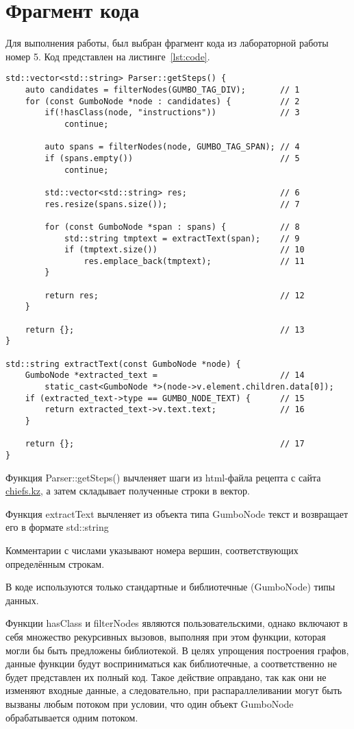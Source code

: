 \chapter{Фрагмент кода}

Для выполнения работы, был выбран фрагмент кода из лабораторной работы номер 5. Код представлен на листинге~\ref{lst:code}.

\begin{lstlisting}[caption={Фрагмент кода из лабораторной работы номер 5}, label={lst:code}]
std::vector<std::string> Parser::getSteps() {
    auto candidates = filterNodes(GUMBO_TAG_DIV);       // 1
    for (const GumboNode *node : candidates) {          // 2
        if(!hasClass(node, "instructions"))             // 3
            continue;

        auto spans = filterNodes(node, GUMBO_TAG_SPAN); // 4
        if (spans.empty())                              // 5
            continue;

        std::vector<std::string> res;                   // 6
        res.resize(spans.size());                       // 7

        for (const GumboNode *span : spans) {           // 8
            std::string tmptext = extractText(span);    // 9
            if (tmptext.size())                         // 10
                res.emplace_back(tmptext);              // 11
        }

        return res;                                     // 12
    }

    return {};                                          // 13
}

std::string extractText(const GumboNode *node) {
    GumboNode *extracted_text =                         // 14
        static_cast<GumboNode *>(node->v.element.children.data[0]);
    if (extracted_text->type == GUMBO_NODE_TEXT) {      // 15
        return extracted_text->v.text.text;             // 16
    }

    return {};                                          // 17
}
\end{lstlisting}

Функция Parser::getSteps() вычленяет шаги из html-файла рецепта с сайта \url{chiefs.kz}, а затем складывает полученные строки в вектор.

Функция extractText вычленяет из объекта типа GumboNode текст и возвращает его в формате std::string

Комментарии с числами указывают номера вершин, соответствующих определённым строкам.

В коде используются только стандартные и библиотечные (GumboNode) типы данных.

Функции hasClass и filterNodes являются пользовательскими, однако включают в себя множество рекурсивных вызовов, выполняя при этом функции, которая могли бы быть предложены библиотекой. В целях упрощения построения графов, данные функции будут восприниматься как библиотечные, а соответственно не будет представлен их полный код. Такое действие оправдано, так как они не изменяют входные данные, а следовательно, при распараллеливании могут быть вызваны любым потоком при условии, что один объект GumboNode обрабатывается одним потоком.
